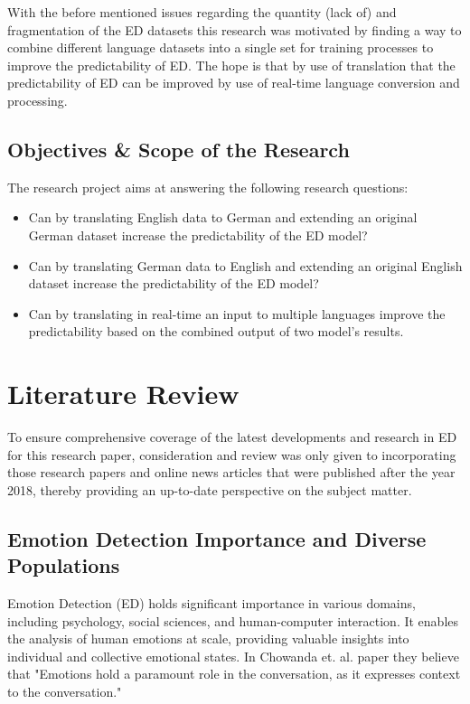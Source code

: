 \documentclass[11pt]{article}
\begin{document}
With the before mentioned issues regarding the quantity (lack of) and fragmentation of the ED datasets this research was motivated by finding a way to combine different language datasets into a single set for training processes to improve the predictability of ED. The hope is that by use of translation that the predictability of ED can be improved by use of real-time language conversion and processing.

\subsection{Objectives \& Scope of the Research}

The research project aims at answering the following research questions:

\begin{itemize}
\item Can by translating English data to German and extending an original German dataset increase the predictability of the ED model?
\item Can by translating German data to English and extending an original English dataset increase the predictability of the ED model?
\item Can by translating in real-time an input to multiple languages improve the predictability based on the combined output of two model's results.
\end{itemize}

\clearpage
\section{Literature Review}
To ensure comprehensive coverage of the latest developments and research in ED for this research paper, consideration and review was only given to incorporating those research papers and online news articles that were published after the year 2018, thereby providing an up-to-date perspective on the subject matter.

\subsection{Emotion Detection Importance and Diverse Populations}
Emotion Detection (ED) holds significant importance in various domains, including psychology, social sciences, and human-computer interaction. It enables the analysis of human emotions at scale, providing valuable insights into individual and collective emotional states. In Chowanda et. al. paper\cite{CHOWANDA-2021821} they believe that "Emotions hold a paramount role in the conversation, as it expresses context to the conversation."
\end{document}
